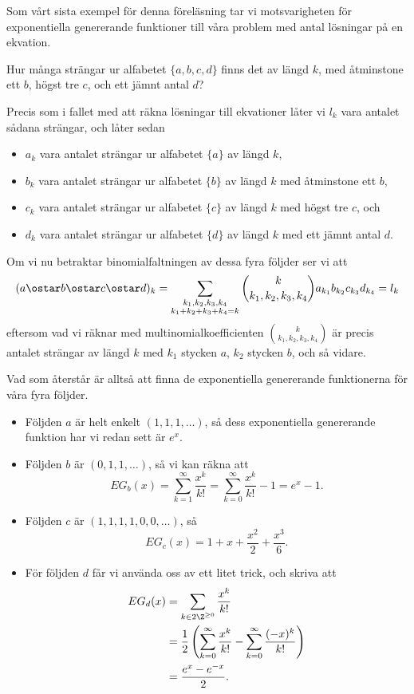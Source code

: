 \documentclass[nobib]{tufte-handout}
\begin{document}
Som vårt sista exempel för denna föreläsning tar vi motsvarigheten för exponentiella genererande funktioner till våra problem med antal lösningar på en ekvation.

\begin{example}
  Hur många strängar ur alfabetet $\{a, b, c, d\}$ finns det av längd $k$, med åtminstone ett $b$, högst tre $c$, och ett jämnt antal $d$?

  Precis som i fallet med att räkna lösningar till ekvationer låter vi $l_k$ vara antalet sådana strängar, och låter sedan
  \begin{itemize}
    \item $a_k$ vara antalet strängar ur alfabetet $\{a\}$ av längd $k$,
    \item $b_k$ vara antalet strängar ur alfabetet $\{b\}$ av längd $k$ med åtminstone ett $b$,
    \item $c_k$ vara antalet strängar ur alfabetet $\{c\}$ av längd $k$ med högst tre $c$, och
    \item $d_k$ vara antalet strängar ur alfabetet $\{d\}$ av längd $k$ med ett jämnt antal $d$.
  \end{itemize}

  Om vi nu betraktar binomialfaltningen av dessa fyra följder ser vi att
  $$(a \ostar b \ostar c \ostar d)_k = \sum_{\substack{k_1, k_2, k_3, k_4\\k_1 + k_2 + k_3 + k_4 = k}} \binom{k}{k_1, k_2, k_3, k_4} a_{k_1}b_{k_2}c_{k_3}d_{k_4} = l_k$$
  eftersom vad vi räknar med multinomialkoefficienten $\binom{k}{k_1, k_2, k_3, k_4}$ är precis antalet strängar av längd $k$ med $k_1$ stycken $a$, $k_2$ stycken $b$, och så vidare.

  Vad som återstår är alltså att finna de exponentiella genererande funktionerna för våra fyra följder.
  \begin{itemize}
    \item Följden $a$ är helt enkelt $(1,1,1,\ldots)$, så dess exponentiella genererande funktion har vi redan sett är $e^x$.
    \item Följden $b$ är $(0,1,1,\ldots)$, så vi kan räkna att 
    $$EG_b(x) = \sum_{k=1}^{\infty} \frac{x^k}{k!} = \sum_{k=0}^{\infty} \frac{x^k}{k!} - 1 = e^x - 1.$$
    \item Följden $c$ är $(1,1,1,1,0,0,\ldots)$, så 
    $$EG_c(x) = 1 + x + \frac{x^2}{2} + \frac{x^3}{6}.$$
    \item För följden $d$ får vi använda oss av ett litet trick, och skriva att 
    \begin{align*}
      EG_d(x) &= \sum_{k \in 2\Z^{\geq 0}} \frac{x^k}{k!}\\
      &= \frac{1}{2}\left(\sum_{k=0}^{\infty} \frac{x^k}{k!} - \sum_{k=0}^{\infty} \frac{(-x)^k}{k!}\right)\\
      &= \frac{e^x - e^{-x}}{2}.
    \end{align*}
  \end{itemize}


\end{example}
\end{document}
